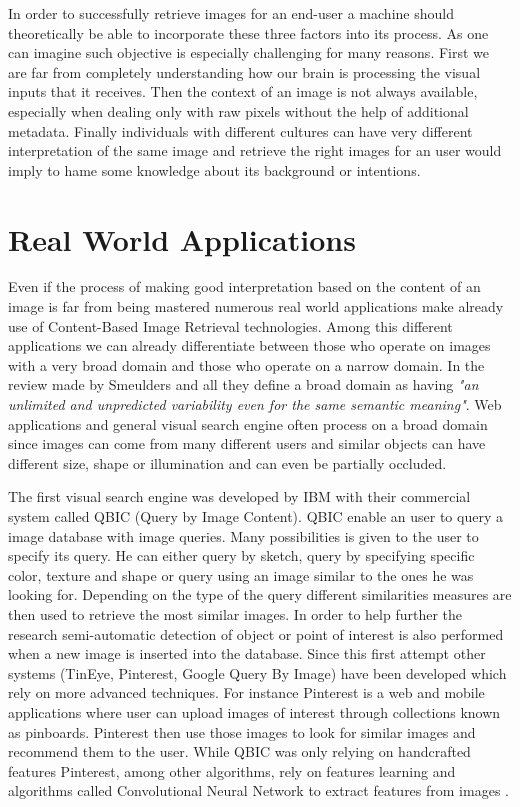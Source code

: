     In order to successfully retrieve images for an end-user a machine should theoretically be able to incorporate these three factors into its process. As one can imagine such objective is especially challenging for many reasons. First we are far from completely understanding how our brain is processing the visual inputs that it receives. Then the context of an image is not always available, especially when dealing only with raw pixels without the help of additional metadata. Finally individuals with different cultures can have very different interpretation of the same image and retrieve the right images for an user would imply to hame some knowledge about its background or intentions.

  \section{Real World Applications}

  Even if the process of making good interpretation based on the content of an image is far from being mastered
  numerous real world applications make already use of Content-Based Image Retrieval technologies. Among this different applications we can already differentiate between those who operate on images with a very broad domain and those who operate on a narrow domain. In the review made by Smeulders and all \cite{smeulders2000content} they define a broad domain as having \textit{"an unlimited and unpredicted variability even for the same semantic meaning"}. Web applications and general visual search engine often process on a broad domain since images can come from many different users and similar objects can have different size, shape or illumination and can even be partially occluded.

  The first visual search engine was developed by IBM with their commercial system called QBIC (Query by Image Content)\cite{QBIC}. QBIC enable an user to query a image database with image queries. Many possibilities is given to the user to specify its query. He can either query by sketch, query by specifying specific color, texture and shape or query using an image similar to the ones he was looking for. Depending on the type of the query different similarities measures are then used to retrieve the most similar images. In order to help further the research semi-automatic detection of object or point of interest is also performed when a new image is inserted into the database. Since this first attempt other systems (TinEye, Pinterest, Google Query By Image) have been developed which rely on more advanced techniques. For instance Pinterest is a web and mobile applications where user can upload images of interest through collections known as pinboards. Pinterest then use those images to look for similar images and recommend them to the user. While QBIC was only relying on handcrafted features Pinterest, among other algorithms, rely on features learning and algorithms called Convolutional Neural Network to extract features from images \cite{jing2015visual}.

